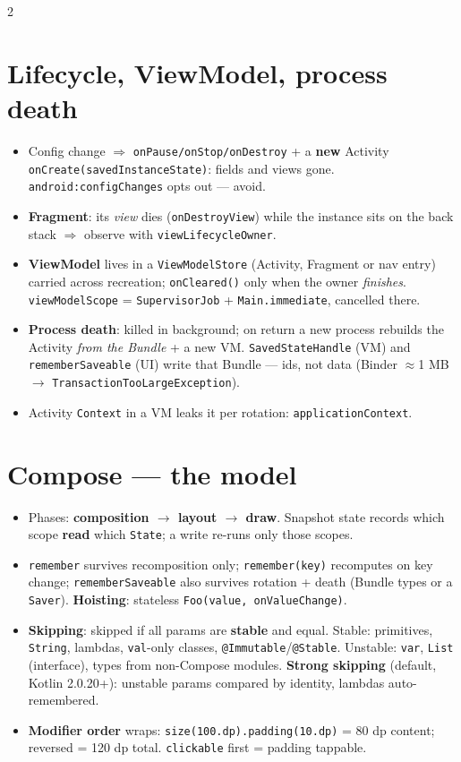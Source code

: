 \documentclass[8pt]{extarticle}
\begin{document}
\begin{multicols}{2}
\raggedright

\section{Lifecycle, ViewModel, process death}
\begin{itemize}\raggedright
  \item Config change $\Rightarrow$ \texttt{onPause/onStop/onDestroy} + a \textbf{new}
        Activity \texttt{onCreate(savedInstanceState)}: fields and views gone.
        \texttt{android:configChanges} opts out — avoid.
  \item \textbf{Fragment}: its \emph{view} dies (\texttt{onDestroyView}) while the instance
        sits on the back stack $\Rightarrow$ observe with \texttt{viewLifecycleOwner}.
  \item \textbf{ViewModel} lives in a \texttt{ViewModelStore} (Activity, Fragment or nav
        entry) carried across recreation; \texttt{onCleared()} only when the owner
        \emph{finishes}. \texttt{viewModelScope} = \texttt{SupervisorJob} +
        \texttt{Main.immediate}, cancelled there.
  \item \textbf{Process death}: killed in background; on return a new process rebuilds the
        Activity \emph{from the Bundle} + a new VM. \texttt{SavedStateHandle} (VM) and
        \texttt{rememberSaveable} (UI) write that Bundle — ids, not data (Binder
        $\approx$1 MB $\to$ \texttt{TransactionTooLargeException}).
  \item Activity \texttt{Context} in a VM leaks it per rotation: \texttt{applicationContext}.
\end{itemize}

\section{Compose — the model}
\begin{itemize}\raggedright
  \item Phases: \textbf{composition $\to$ layout $\to$ draw}. Snapshot state records which
        scope \textbf{read} which \texttt{State}; a write re-runs only those scopes.
  \item \texttt{remember} survives recomposition only; \texttt{remember(key)} recomputes on
        key change; \texttt{rememberSaveable} also survives rotation + death (Bundle types
        or a \texttt{Saver}). \textbf{Hoisting}: stateless \texttt{Foo(value, onValueChange)}.
  \item \textbf{Skipping}: skipped if all params are \textbf{stable} and equal. Stable:
        primitives, \texttt{String}, lambdas, \texttt{val}-only classes,
        \texttt{@Immutable}/\texttt{@Stable}. Unstable: \texttt{var}, \texttt{List}
        (interface), types from non-Compose modules. \textbf{Strong skipping} (default,
        Kotlin 2.0.20+): unstable params compared by identity, lambdas auto-remembered.
  \item \textbf{Modifier order} wraps: \texttt{size(100.dp).padding(10.dp)} = 80 dp content;
        reversed = 120 dp total. \texttt{clickable} first = padding tappable.
\end{itemize}


\end{multicols}
\end{document}
